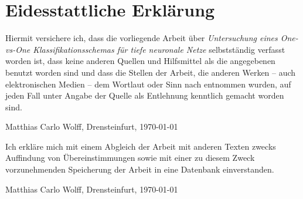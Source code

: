 \chapter*{Eidesstattliche Erklärung}


Hiermit versichere ich, dass die vorliegende Arbeit über \textit{\glqq Untersuchung eines One-vs-One Klassifikationsschemas für tiefe neuronale Netze\grqq} selbstständig verfasst worden ist, dass keine anderen Quellen und Hilfsmittel als die angegebenen benutzt worden sind und dass die Stellen der Arbeit, die anderen Werken – auch elektronischen Medien – dem Wortlaut oder Sinn nach entnommen wurden, auf jeden Fall unter Angabe der Quelle als Entlehnung kenntlich gemacht worden sind.

\vspace{1cm}

\parbox{20em}{\hrulefill}

Matthias Carlo Wolff, Drensteinfurt, \today

\vspace{1cm}

Ich erkläre mich mit einem Abgleich der Arbeit mit anderen Texten zwecks Auffindung von Übereinstimmungen sowie mit einer zu diesem Zweck vorzunehmenden Speicherung der Arbeit in eine Datenbank einverstanden.

\vspace{1cm}

\parbox{20em}{\hrulefill}

Matthias Carlo Wolff, Drensteinfurt, \today